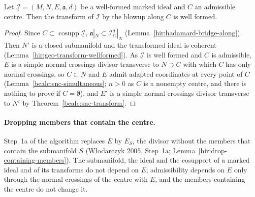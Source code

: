 \begin{corollary}
\label{bcalc:transform-wellformed}
\mixedleanok
Let \(\underline{\mathcal I}=(M,N,E,\mathfrak a,d)\) be a well-formed marked ideal and \(C\) an admissible centre. Then the transform of
\(\underline{\mathcal I}\) by the blowup along \(C\) is well formed.
\end{corollary}
\begin{proof}
\mixedleanok
Since \(C\subset\operatorname{cosupp}\underline{\mathcal I}\), \(\mathfrak a|_N\subset\mathcal I_C^d|_N\) (Lemma~\ref{hir:hadamard-bridge-along}). Then \(N'\) is a closed
submanifold and the transformed ideal is coherent (Lemma~\ref{hir:geo-transform-wellformed}). As \(\underline{\mathcal I}\) is well formed and \(C\)
is admissible, \(E\) is a simple normal crossings divisor transverse to \(N\supset C\) with which \(C\) has only normal crossings, so \(C\subset N\)
and \(E\) admit adapted coordinates at every point of \(C\) (Lemma~\ref{bcalc:snc-simultaneous}; \(n>0\) as \(C\) is a nonempty centre, and there
is nothing to prove if \(C=\emptyset\)), and \(E'\) is a simple normal crossings divisor transverse to \(N'\) by Theorem~\ref{bcalc:snc-transform}.
\end{proof}

\paragraph{Dropping members that contain the centre.} Step~1a of the algorithm replaces \(E\) by \(E_S\), the divisor without the members
that contain the submanifold \(S\) (Włodarczyk 2005, Step~1a; Lemma~\ref{hir:drop-containing-members}). The submanifold, the ideal and the
cosupport of a marked ideal and of its transforms do not depend on \(E\); admissibility depends on \(E\) only through the normal crossings of the
centre with \(E\), and the members containing the centre do not change it.

